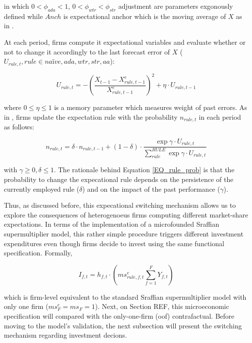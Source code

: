 \documentclass{SelfArx}
\begin{document}
in which \(0 < \phi_{ada} < 1\), \(0 < \phi_{wtr} < \phi_{str}\) adjustment are parameters exgonously defined while \(Anch\) is expectational anchor which is the moving average of \(X\) as in \textcite{reissl_2021_Heterogeneousa}.

At each period, firms compute it expectational variables and evaluate whether or not to change it accordingly to the last forecast error of \(X\) (\(U_{rule,t}, rule \in {na\text{\"i}ve}, ada, wtr, str, aa\)):
\begin{latex}
\begin{equation}
\label{Ch_super_EQ_LFE}
U_{rule,t} = - \left(\frac{X_{t-1} - X^{e}_{rule,t-1}}{X^{e}_{rule,t-1}}\right)^{2} + \eta\cdot U_{rule,t-1}
\end{equation}
\end{latex}
where \(0 \leq \eta \leq 1\) is a memory parameter which measures weight of past errors.
As in \textcite{dosi_2020_RATIONAL}, firms update the expectation rule with the probability \(n_{rule,t}\) in each period as follows:
\begin{latex}
\begin{equation}
\label{Ch_super_EQ_rule_prob}
n_{rule,t} = \delta\cdot n_{rule,t-1} + (1-\delta)\cdot \frac{\exp{\gamma\cdot U_{rule,t}}}{\sum_{rule}^{RULE}\exp{\gamma\cdot U_{rule,t}}}
\end{equation}
\end{latex}
with \(\gamma \geq 0, \delta \leq 1\).
The rationale behind Equation \ref{EQ_rule_prob} is that the probability to change the expecational rule depends on the persistence of the currently employed rule (\(\delta\)) and on the impact of the past performance (\(\gamma\)).

Thus, as discussed before, this expecational switching mechanism allows us to explore the consequences of heterogenoeus firms computing different market-share expectations.
In terms of the implementation of a microfounded Sraffian supermultiplier model, this rather simple procedure triggers different investment expenditures even though firms decide to invest using the same functional specification.
Formally,


\begin{latex}
\begin{equation}
I_{f,t} = h_{f,t} \cdot \left(ms^{e}_{rule,f,t} \sum_{f=1}^{F}Y_{f,t}\right)
\end{equation}
\end{latex}
which is firm-level equivalent to the standard Sraffian supermultiplier model with only one firm (\(ms^{e}_{F} = ms_{F} = 1\)).
Next, on Section REF, this microeconomic specification will compared with the only-one-firm (oof) contrafactual.
Before moving to the model's validation, the next subsection will present the switching mechanism regarding investment decions.
\end{document}
